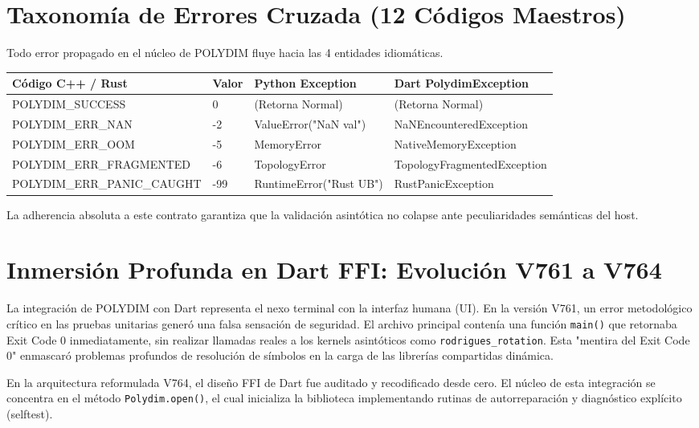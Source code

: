 \section{Taxonomía de Errores Cruzada (12 Códigos Maestros)}
Todo error propagado en el núcleo de POLYDIM fluye hacia las 4 entidades idiomáticas.

\centering
\begin{tabular}{|l|l|l|l|}
\hline
\textbf{Código C++ / Rust} & \textbf{Valor} & \textbf{Python Exception} & \textbf{Dart PolydimException} \\ \hline
POLYDIM\_SUCCESS           & 0              & (Retorna Normal)          & (Retorna Normal)               \\
POLYDIM\_ERR\_NAN          & -2             & ValueError("NaN val")     & NaNEncounteredException        \\
POLYDIM\_ERR\_OOM          & -5             & MemoryError               & NativeMemoryException          \\
POLYDIM\_ERR\_FRAGMENTED   & -6             & TopologyError             & TopologyFragmentedException    \\
POLYDIM\_ERR\_PANIC\_CAUGHT& -99            & RuntimeError("Rust UB")   & RustPanicException             \\ \hline
\end{tabular}

La adherencia absoluta a este contrato garantiza que la validación asintótica no colapse ante peculiaridades semánticas del host.

\section{Inmersión Profunda en Dart FFI: Evolución V761 a V764}

La integración de POLYDIM con Dart representa el nexo terminal con la interfaz humana (UI). En la versión V761, un error metodológico crítico en las pruebas unitarias generó una falsa sensación de seguridad. El archivo principal contenía una función \texttt{main()} que retornaba Exit Code 0 inmediatamente, sin realizar llamadas reales a los kernels asintóticos como \texttt{rodrigues\_rotation}. Esta "mentira del Exit Code 0" enmascaró problemas profundos de resolución de símbolos en la carga de las librerías compartidas dinámica.

En la arquitectura reformulada V764, el diseño FFI de Dart fue auditado y recodificado desde cero. El núcleo de esta integración se concentra en el método \texttt{Polydim.open()}, el cual inicializa la biblioteca implementando rutinas de autorreparación y diagnóstico explícito (selftest). 

